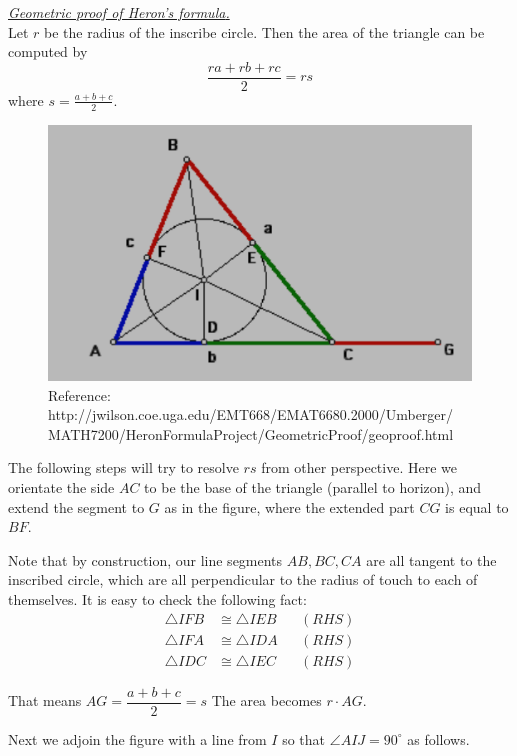 \documentclass[12pt]{article}
\renewenvironment{proof}[1][Proof]{\begin{snugshade*} \underline{\textit{{#1}.}}\\}{\hfill \qedsymbol \end{snugshade*}}
\begin{document}
    \begin{proof}[Geometric proof of Heron's formula]
        Let $r$ be the radius of the inscribe circle. Then the area of the triangle can be computed by $$\frac{ra+rb+rc}{2}=rs$$ where $s=\frac{a+b+c}{2}$. 

        \begin{figure}[H]
            \centering
            \includegraphics[scale=1.8]{heron.png}
            \caption{Reference: http://jwilson.coe.uga.edu/EMT668/EMAT6680.2000/Umberger/\\MATH7200/HeronFormulaProject/GeometricProof/geoproof.html}
        \end{figure}

        The following steps will try to resolve $rs$ from other perspective. Here we orientate the side $AC$ to be the base of the triangle (parallel to horizon), and extend the segment to $G$ as in the figure, where the extended part $CG$ is equal to $BF$.
        
        Note that by construction, our line segments $AB,BC,CA$ are all tangent to the inscribed circle, which are all perpendicular to the radius of touch to each of themselves. It is easy to check the following fact:\begin{align*}
            \triangle IFB &\cong \triangle IEB &&(RHS)\\
            \triangle IFA &\cong \triangle IDA &&(RHS)\\
            \triangle IDC &\cong \triangle IEC &&(RHS)
        \end{align*}
        
        That means $AG=\dfrac{a+b+c}{2}=s$ The area becomes $r\cdot AG$.

        Next we adjoin the figure with a line from $I$ so that $\angle AIJ = 90^\circ$ as follows.


\end{proof}
\end{document}
